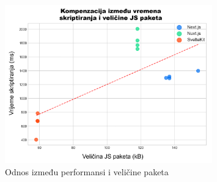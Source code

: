 \begin{figure}[H]
    \centering
    \includegraphics[width=0.8\textwidth]{slike/rezultati/dodatne-metrike/performance_vs_bundle_size_tradeoff.png}
    \caption{Odnos između performansi i veličine paketa}
    \label{fig:performance_vs_bundle_size_tradeoff}
\end{figure}
